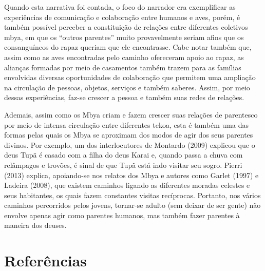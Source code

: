 Quando esta narrativa foi contada, o foco do narrador era exemplificar
as experiências de comunicação e colaboração entre humanos e aves,
porém, é também possível perceber a constituição de relações entre
diferentes coletivos mbya, em que os ``outros parentes'' muito
provavelmente seriam afins que os consanguíneos do rapaz queriam que
ele encontrasse. Cabe notar também que, assim como as aves encontradas
pelo caminho ofereceram apoio ao rapaz, as alianças formadas por meio
de casamentos também trazem para as famílias envolvidas diversas
oportunidades de colaboração que permitem uma ampliação na circulação
de pessoas, objetos, serviços e também saberes. Assim, por meio dessas
experiências, faz-se crescer a pessoa e também suas redes de relações.

Ademais, assim como os Mbya criam e fazem crescer suas relações de
parentesco por meio de intensa circulação entre diferentes tekoa, esta
é também uma das formas pelas quais os Mbya se aproximam dos modos de
agir dos seus parentes divinos. Por exemplo, um dos interlocutores de
Montardo (2009) explicou que o deus Tupã é casado com a filha do deus
Karai e, quando passa a chuva com relâmpagos e trovões, é sinal de que
Tupã está indo visitar seu sogro. Pierri (2013) explica, apoiando-se
nos relatos dos Mbya e autores como Garlet (1997) e Ladeira (2008), que
existem caminhos ligando as diferentes moradas celestes e seus
habitantes, os quais fazem constantes visitas recíprocas. Portanto, nos
vários caminhos percorridos pelos jovens, tornar-se adulto (sem deixar
de ser gente) não envolve apenas agir como parentes humanos, mas também
fazer parentes à maneira dos deuses.

\section{Referências}

